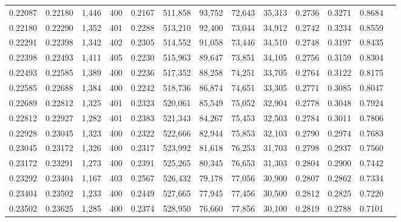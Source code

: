 \begin{tabular}{rrrrrrrrrrrrr}
0.22087 & 0.22180 &  1,446 & 400 &                                     0.2167 & 511,858 &  93,752 &  72,643 &  35,313 & 0.2736 & 0.3271 & 0.8684 \\
0.22180 & 0.22290 &  1,352 & 401 &                                     0.2288 & 513,210 &  92,400 &  73,044 &  34,912 & 0.2742 & 0.3234 & 0.8559 \\
0.22291 & 0.22398 &  1,342 & 402 &                                     0.2305 & 514,552 &  91,058 &  73,446 &  34,510 & 0.2748 & 0.3197 & 0.8435 \\
0.22398 & 0.22493 &  1,411 & 405 &                                     0.2230 & 515,963 &  89,647 &  73,851 &  34,105 & 0.2756 & 0.3159 & 0.8304 \\
0.22493 & 0.22585 &  1,389 & 400 &                                     0.2236 & 517,352 &  88,258 &  74,251 &  33,705 & 0.2764 & 0.3122 & 0.8175 \\
0.22585 & 0.22688 &  1,384 & 400 &                                     0.2242 & 518,736 &  86,874 &  74,651 &  33,305 & 0.2771 & 0.3085 & 0.8047 \\
0.22689 & 0.22812 &  1,325 & 401 &                                     0.2323 & 520,061 &  85,549 &  75,052 &  32,904 & 0.2778 & 0.3048 & 0.7924 \\
0.22812 & 0.22927 &  1,282 & 401 &                                     0.2383 & 521,343 &  84,267 &  75,453 &  32,503 & 0.2784 & 0.3011 & 0.7806 \\
0.22928 & 0.23045 &  1,323 & 400 &                                     0.2322 & 522,666 &  82,944 &  75,853 &  32,103 & 0.2790 & 0.2974 & 0.7683 \\
0.23045 & 0.23172 &  1,326 & 400 &                                     0.2317 & 523,992 &  81,618 &  76,253 &  31,703 & 0.2798 & 0.2937 & 0.7560 \\
0.23172 & 0.23291 &  1,273 & 400 &                                     0.2391 & 525,265 &  80,345 &  76,653 &  31,303 & 0.2804 & 0.2900 & 0.7442 \\
0.23292 & 0.23404 &  1,167 & 403 &                                     0.2567 & 526,432 &  79,178 &  77,056 &  30,900 & 0.2807 & 0.2862 & 0.7334 \\
0.23404 & 0.23502 &  1,233 & 400 &                                     0.2449 & 527,665 &  77,945 &  77,456 &  30,500 & 0.2812 & 0.2825 & 0.7220 \\
0.23502 & 0.23625 &  1,285 & 400 &                                     0.2374 & 528,950 &  76,660 &  77,856 &  30,100 & 0.2819 & 0.2788 & 0.7101 \\

\end{tabular}
